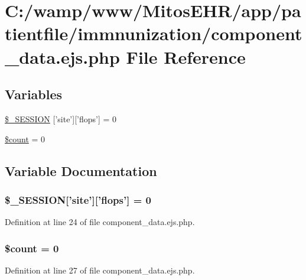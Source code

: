 \hypertarget{patientfile_2immnunization_2component__data_8ejs_8php}{\section{\-C\-:/wamp/www/\-Mitos\-E\-H\-R/app/patientfile/immnunization/component\-\_\-data.ejs.\-php \-File \-Reference}
\label{patientfile_2immnunization_2component__data_8ejs_8php}
}
\subsection*{\-Variables}
\begin{DoxyCompactItemize}
\item 
\hyperlink{patientfile_2immnunization_2component__data_8ejs_8php_a99fda8552a3e58235643b79f5af3ded8}{\$\-\_\-\-S\-E\-S\-S\-I\-O\-N} \mbox{[}'site'\mbox{]}\mbox{[}'flops'\mbox{]} = 0
\item 
\hyperlink{patientfile_2immnunization_2component__data_8ejs_8php_af789423037bbc89dc7c850e761177570}{\$count} = 0
\end{DoxyCompactItemize}


\subsection{\-Variable \-Documentation}
\hypertarget{patientfile_2immnunization_2component__data_8ejs_8php_a99fda8552a3e58235643b79f5af3ded8}{
\subsubsection[{\$\-\_\-\-S\-E\-S\-S\-I\-O\-N}]{\setlength{\rightskip}{0pt plus 5cm}\$\-\_\-\-S\-E\-S\-S\-I\-O\-N\mbox{[}'site'\mbox{]}\mbox{[}'flops'\mbox{]} = 0}}\label{patientfile_2immnunization_2component__data_8ejs_8php_a99fda8552a3e58235643b79f5af3ded8}


\-Definition at line 24 of file component\-\_\-data.\-ejs.\-php.

\hypertarget{patientfile_2immnunization_2component__data_8ejs_8php_af789423037bbc89dc7c850e761177570}{
\subsubsection[{\$count}]{\setlength{\rightskip}{0pt plus 5cm}\$count = 0}}\label{patientfile_2immnunization_2component__data_8ejs_8php_af789423037bbc89dc7c850e761177570}


\-Definition at line 27 of file component\-\_\-data.\-ejs.\-php.

